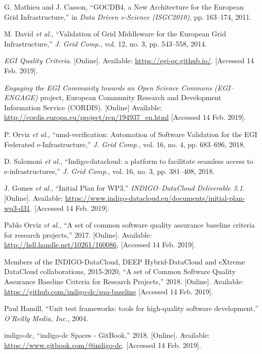 \begin{thebibliography}{1}
G. Mathieu and J. Casson,
``GOCDB4, a New Architecture for the European Grid Infrastructure,''
in \emph{Data Driven e-Science (ISGC2010)},
pp. 163--174, 2011.

M. David \emph{et al.},
``Validation of Grid Middleware for the European Grid Infrastructure,''
\emph{J. Grid Comp.},
vol. 12, no. 3, pp. 543--558, 2014.

\emph{EGI Quality Criteria}.
[Online]. Available: \url{https://egi-qc.github.io/}.
[Accessed 14 Feb. 2019].

\emph{Engaging the EGI Community towards an Open Science Commons (EGI--ENGAGE)}
project, European Community Research and Development Information Service (CORDIS).
[Online] Available: \url{http://cordis.europa.eu/project/rcn/194937_en.html}
[Accessed 14 Feb. 2019].

P. Orviz \emph{et al.},
``umd-verification: Automation of Software Validation for the EGI Federated e-Infrastructure,''
\emph{J. Grid Comp.},
vol. 16, no. 4, pp. 683--696, 2018.

D. Salomoni \emph{et al.},
``Indigo-datacloud: a platform to facilitate seamless access to e-infrastructures,''
\emph{J. Grid Comp.},
vol. 16, no. 3, pp. 381--408, 2018.

J. Gomes \emph{et al.},
``Initial Plan for WP3,''
\emph{INDIGO--DataCloud Deliverable 3.1}.
[Online]. Available: \url{https://www.indigo-datacloud.eu/documents/initial-plan-wp3-d31}.
[Accessed 14 Feb. 2019].

Pablo Orviz \emph{et al.},
``A set of common software quality assurance baseline criteria for research projects,''
2017.
[Online]. Available: \url{http://hdl.handle.net/10261/160086}.
[Accessed 14 Feb. 2019].

Members of the INDIGO-DataCloud, DEEP Hybrid-DataCloud and eXtreme DataCloud collaborations, 2015-2020,
``A set of Common Software Quality Assurance Baseline Criteria for Research Projects,''
2018.
[Online]. Available: \url{https://github.com/indigo-dc/sqa-baseline}
[Accessed 14 Feb. 2019].

Paul Hamill,
``Unit test frameworks: tools for high-quality software development,''
\emph{O'Reilly Media, Inc.},
2004.


indigo-dc, ``indigo-dc Spaces - GitBook,''
2018.
[Online]. Available: \url{https://www.gitbook.com/@indigo-dc}.
[Accessed 14 Feb. 2019].


\end{thebibliography}

